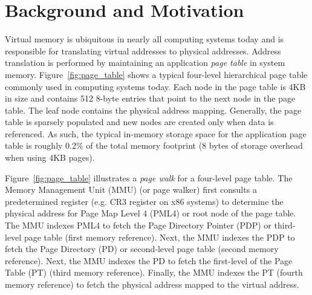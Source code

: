 
\section{Background and Motivation} 
\label{sec:background}

\noindent Virtual memory is ubiquitous in nearly all computing systems
today and is responsible for translating virtual addresses to physical
addresses. Address translation is performed by maintaining an
application {\em page table} in system memory.
Figure~\ref{fig:page_table} shows a typical four-level
hierarchical page table commonly used in computing systems today. Each
node in the page table is 4KB in size and contains 512 8-byte entries
that point to the next node in the page table. The leaf node contains
the physical address mapping. Generally, the page table is sparsely
populated and new nodes are created only when data is referenced. As
such, the typical in-memory storage space for the application page
table is roughly 0.2\% of the total memory footprint (8 bytes of
storage overhead when using 4KB pages).


Figure~\ref{fig:page_table} illustrates a {\em page walk} for a
four-level page table. The Memory Management Unit (MMU) (or page
walker) first consults a predetermined register (e.g. CR3 register on
x86 systems) to determine the physical address for Page Map Level 4
(PML4) or root node of the page table. The MMU indexes PML4 to fetch
the Page Directory Pointer (PDP) or third-level page table (first
memory reference). Next, the MMU indexes the PDP to fetch the Page
Directory (PD) or second-level page table (second memory reference).
Next, the MMU indexes the PD to fetch the first-level of the Page
Table (PT) (third memory reference). Finally, the MMU indexes the PT
(fourth memory reference) to fetch the physical address mapped to the
virtual address.


% 
% 

